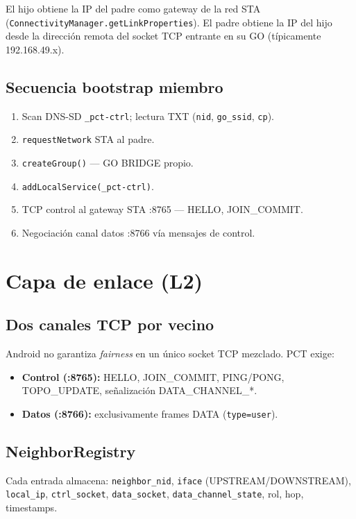 El hijo obtiene la IP del padre como gateway de la red STA (\texttt{ConnectivityManager.getLinkProperties}). El padre obtiene la IP del hijo desde la dirección remota del socket TCP entrante en su GO (típicamente 192.168.49.x).

\subsection{Secuencia bootstrap miembro}

\begin{enumerate}
  \item Scan DNS-SD \texttt{\_pct-ctrl}; lectura TXT (\texttt{nid}, \texttt{go\_ssid}, \texttt{cp}).
  \item \texttt{requestNetwork} STA al padre.
  \item \texttt{createGroup()} --- GO BRIDGE propio.
  \item \texttt{addLocalService(\_pct-ctrl)}.
  \item TCP control al gateway STA :8765 --- HELLO, JOIN\_COMMIT.
  \item Negociación canal datos :8766 vía mensajes de control.
\end{enumerate}

\section{Capa de enlace (L2)}
\label{sec:diseno-l2}

\subsection{Dos canales TCP por vecino}

Android no garantiza \emph{fairness} en un único socket TCP mezclado. PCT exige:

\begin{itemize}
  \item \textbf{Control (:8765):} HELLO, JOIN\_COMMIT, PING/PONG, TOPO\_UPDATE, señalización DATA\_CHANNEL\_*.
  \item \textbf{Datos (:8766):} exclusivamente frames DATA (\texttt{type=user}).
\end{itemize}

\subsection{NeighborRegistry}

Cada entrada almacena: \texttt{neighbor\_nid}, \texttt{iface} (UPSTREAM/DOWNSTREAM), \texttt{local\_ip}, \texttt{ctrl\_socket}, \texttt{data\_socket}, \texttt{data\_channel\_state}, rol, hop, timestamps.

